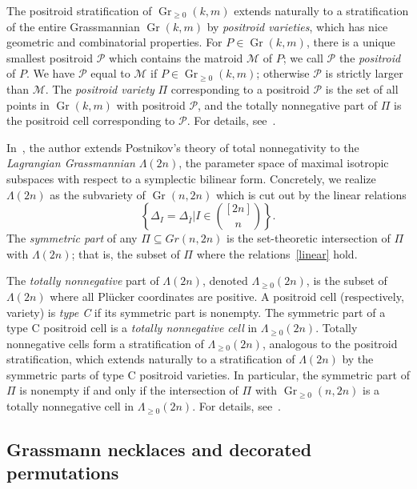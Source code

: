 \documentclass[ALCO,ThmDefs,Unicode,epreuves]{cedram}
\DeclareMathOperator{\Gr}{Gr}
\newcommand{\Lm}{\Lambda}
\begin{document}
The positroid stratification of $\Gr_{\geq 0}(k,m)$ extends naturally to a stratification of the entire Grassmannian $\Gr(k,m)$ by \emph{positroid varieties}, which has nice geometric and combinatorial properties. For $P \in \Gr(k,m)$, there is a unique smallest positroid $\mathscr{P}$ which contains the matroid $\mathcal{M}$ of $P$; we call $\mathscr{P}$ the \emph{positroid} of $P$. We have $\mathscr{P}$ equal to $\mathcal{M}$ if $P \in \Gr_{\geq 0}(k,m)$; otherwise $\mathscr{P}$ is strictly larger than $\mathcal{M}$. The \emph{positroid variety} $\Pi$ corresponding to a positroid $\mathscr{P}$ is the set of all points in $\Gr(k,m)$ with positroid $\mathscr{P}$, and the totally nonnegative part of $\Pi$ is the positroid cell corresponding to $\mathscr{P}$. For details, see~\cite{KLS13}.

In~\cite{Kar18}, the author extends Postnikov's theory of total nonnegativity to the \emph{Lagrangian Grassmannian} $\Lm(2n)$, the parameter space of maximal isotropic subspaces with respect to a symplectic bilinear form. Concretely, we realize $\Lm(2n)$ as the subvariety of $\Gr(n,2n)$ which is cut out by the linear relations
\begin{equation}
\label{linear} \left\{\Delta_I = \Delta_{\bar{I}} \mathrel{\Bigg|} I \in \binom{[2n]}{n} \right\}.\end{equation} 
The \emph{symmetric part} of any $\Pi \subseteq Gr(n,2n)$ is the set-theoretic intersection of $\Pi$ with $\Lm(2n)$; that is, the subset of $\Pi$ where the relations~\eqref{linear} hold. 
 
The \emph{totally nonnegative} part of $\Lm(2n)$, denoted $\Lm_{\geq 0}(2n)$, is the subset of $\Lm(2n)$ where all Pl{\"u}cker coordinates are positive. A positroid cell (respectively, variety) is \emph{type C} if its symmetric part is nonempty. The symmetric part of a type C positroid cell is a \emph{totally nonnegative cell} in $\Lm_{\geq 0}(2n)$. Totally nonnegative cells form a stratification of $\Lm_{\geq 0}(2n)$, analogous to the positroid stratification, which extends naturally to a stratification of $\Lm(2n)$ by the symmetric parts of type C positroid varieties. In particular, the symmetric part of $\Pi$ is nonempty if and only if the intersection of $\Pi$ with $\Gr_{\geq 0}(n,2n)$ is a totally nonnegative cell in $\Lm_{\geq 0}(2n)$. For details, see~\cite{Kar18}. 

\subsection{Grassmann necklaces and decorated permutations}
\end{document}
